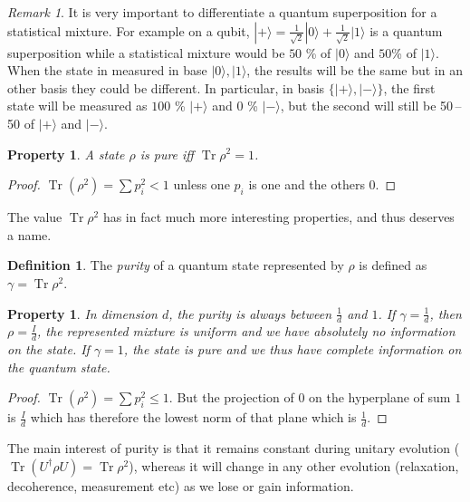 \documentclass[10pt,a4paper]{report}
\theoremstyle{plain}
\newtheorem{prop}[thm]{Property}
\theoremstyle{definition}
\newtheorem{defn}{Definition}[chapter]
\theoremstyle{remark}
\newtheorem*{rem}{Remark}
\newcommand{\ket}[1]{|#1\rangle}
\renewcommand{\leq}{\leqslant}
\DeclareMathOperator{\Tr}{Tr}
\begin{document}
\begin{rem}
  It is very important to differentiate a quantum superposition for a
  statistical mixture. For example on a qubit,
  $\ket + = \frac1{\sqrt 2} \ket 0 + \frac1{\sqrt2} \ket 1$ is a quantum
  superposition while a statistical mixture would be
  $50$ \% of $\ket 0$ and $50$\% of $\ket 1$. When the state in measured in base
  $\ket0,\ket1$, the results will be the same but in an other basis they could be
  different. In particular, in basis $\{\ket +, \ket -\}$, the first state will be
  measured as $100$ \% $\ket +$ and $0$ \% $\ket -$, but the second will still be
  50\,--\,50 of $\ket+$ and $\ket -$.
\end{rem}

\begin{prop}
  A state $\rho$ is pure iff $\Tr \rho^2 = 1$.
\end{prop}

\begin{proof}
  $\Tr (\rho^2) = \sum p_i^2 < 1$ unless one $p_i$ is one and the others 0.
\end{proof}

The value $\Tr \rho^2$ has in fact much more interesting properties, and thus
deserves a name.

\begin{defn}
  The \emph{purity} of a quantum state represented by $\rho$ is defined as $\gamma = \Tr \rho^2$.
\end{defn}

\begin{prop}
  In dimension $d$, the purity is always between $\frac1d$ and $1$. If $\gamma =
  \frac1d$, then $\rho = \frac I d$, the represented mixture is uniform and we have
  absolutely no information on the state. If $\gamma = 1$, the state is pure and
  we thus have complete information on the quantum state.
\end{prop}

\begin{proof} $\Tr (\rho^2) = \sum p_i^2 \leq 1$.
  But the projection of $0$ on the hyperplane of sum $1$ is $\frac I d$ which
  has therefore the lowest norm of that plane which is $\frac 1 d$.
\end{proof}

The main interest of purity is that it remains constant during unitary evolution
($\Tr (U^\dagger \rho U) = \Tr \rho^2$),
whereas it will change in any other evolution (relaxation, decoherence,
measurement etc) as we lose or gain information.
\end{document}

